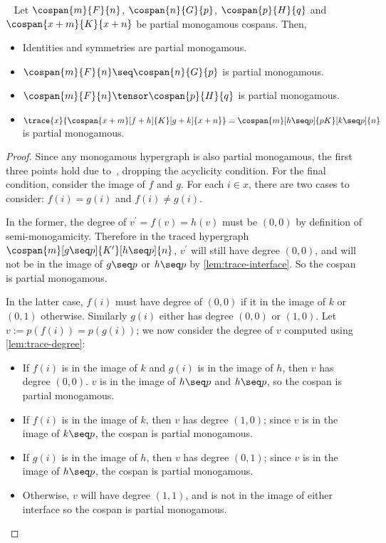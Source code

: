 \begin{lemma}~\label{lem:partial monogamous-ops}
    Let \(\cospan{m}{F}{n}\), \(\cospan{n}{G}{p}\), \(\cospan{p}{H}{q}\) and \(\cospan{x+m}{K}{x+n}\) be partial monogamous cospans.
    Then,
    \begin{itemize}
        \item Identities and symmetries are partial monogamous.
        \item \(\cospan{m}{F}{n} \seq \cospan{n}{G}{p}\) is partial monogamous.
        \item \(\cospan{m}{F}{n} \tensor \cospan{p}{H}{q}\) is partial monogamous.
        \item \(\trace{x}{\cospan{x+m}[f+h]{K}[g+k]{x+n}} = \cospan{m}[h \seq p]{pK}[k \seq p]{n}\) is partial monogamous.
    \end{itemize}
\end{lemma}
\begin{proof}
    Since any monogamous hypergraph is also partial monogamous, the first three points hold due to~\cite[Prop.16]{bonchi2022string}, dropping the acyclicity condition.
    For the final condition, consider the image of \(f\) and \(g\).
    For each \(i \in x\), there are two cases to consider: \(f(i) = g(i)\) and \(f(i) \neq g(i)\).

    In the former, the degree of \(v^\prime = f(v) = h(v)\) must be \((0,0)\) by definition of semi-monogamicity.
    Therefore in the traced hypergraph \(\cospan{m}[g \seq p]{K^\prime}[h \seq p]{n}\), \(v^\prime\) will still have degree \((0,0)\), and will not be in the image of \(g \seq p\) or \(h \seq p\) by \cref{lem:trace-interface}.
    So the cospan is partial monogamous.

    In the latter case, \(f(i)\) must have degree of \((0,0)\) if it in the image of \(k\) or \((0,1)\) otherwise.
    Similarly \(g(i)\) either has degree \((0,0)\) or \((1,0)\).
    Let \(v := p(f(i)) = p(g(i))\); we now consider the degree of \(v\) computed using \cref{lem:trace-degree}:
    \begin{itemize}
        \item If \(f(i)\) is in the image of \(k\) and \(g(i)\) is in the image of \(h\), then \(v\) has degree \((0,0)\).
        \(v\) is in the image of \(h \seq p\) and \(h \seq p\), so the cospan is partial monogamous.
        \item If \(f(i)\) is in the image of \(k\), then \(v\) has degree \((1, 0)\); since \(v\) is in the image of \(k \seq p\), the cospan is partial monogamous.
        \item If \(g(i)\) is in the image of \(h\), then \(v\) has degree \((0, 1)\); since \(v\) is in the image of \(h \seq p\), the cospan is partial monogamous.
        \item Otherwise, \(v\) will have degree \((1, 1)\), and is not in the image of either interface so the cospan is partial monogamous.
    \end{itemize}
\end{proof}

